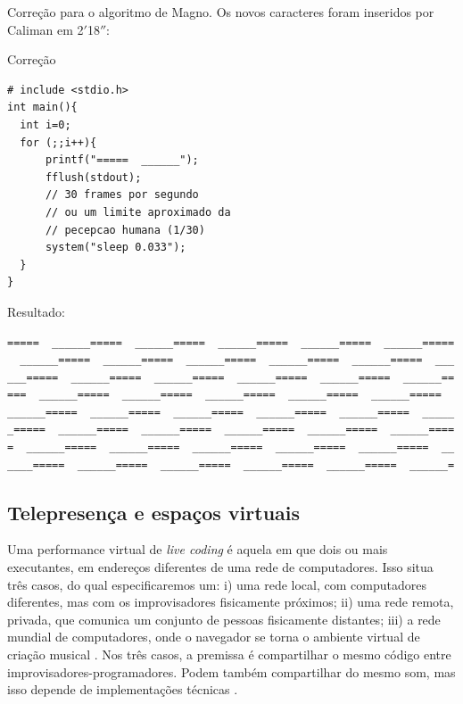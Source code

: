 Correção para o algoritmo de Magno. Os novos caracteres foram inseridos por Caliman em 2$'$18$''$:

\begin{example}{Correção}
\begin{verbatim}
# include <stdio.h>
int main(){
  int i=0;
  for (;;i++){
      printf("=====  ______");
      fflush(stdout);
      // 30 frames por segundo 
      // ou um limite aproximado da
      // pecepcao humana (1/30)
      system("sleep 0.033");
  }
}
\end{verbatim}

Resultado:

\begin{verbatim}
=====  ______=====  ______=====  ______=====  ______=====  ______=====
  ______=====  ______=====  ______=====  ______=====  ______=====  ___
___=====  ______=====  ______=====  ______=====  ______=====  ______==
===  ______=====  ______=====  ______=====  ______=====  ______=====  
______=====  ______=====  ______=====  ______=====  ______=====  _____
_=====  ______=====  ______=====  ______=====  ______=====  ______====
=  ______=====  ______=====  ______=====  ______=====  ______=====  __
____=====  ______=====  ______=====  ______=====  ______=====  ______=

\end{verbatim}
\end{example}

\subsection{Telepresença e espaços virtuais}\label{sec:telepresenca}

Uma performance virtual de \emph{live coding} é aquela em que dois ou mais executantes, em endereços diferentes de uma rede de computadores. Isso situa três casos, do qual especificaremos um: i) uma rede local, com computadores diferentes, mas com os improvisadores fisicamente próximos; ii) uma rede remota, privada, que comunica um conjunto de pessoas fisicamente distantes; iii) a rede mundial de computadores, onde o navegador se torna o ambiente virtual de criação musical \cite{roberts_web_2013}. Nos três casos, a premissa é compartilhar o mesmo código entre improvisadores-programadores. Podem também compartilhar do mesmo som, mas isso depende de implementações técnicas . 

